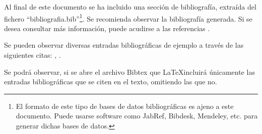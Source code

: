 Al final de este documento se ha incluido una sección de bibliografía, extraída del fichero ``bibliografia.bib''\footnote{El formato de este tipo de bases de datos bibliográficas es ajeno a este documento. Puede usarse software como JabRef, Bibdesk, Mendeley, etc. para generar dichas bases de datos.}. Se recomienda observar la bibliografía generada. Si se desea consultar más información, puede acudirse a las referencias \cite{overleaf-url, latexcompanion}.

Se pueden observar diversas entradas bibliográficas de ejemplo a través de las siguientes citas: \cite{maths-latex}, \cite{lamport}.

Se podrá observar, si se abre el archivo Bibtex que \LaTeX incluirá únicamente las entradas bibliográficas que se citen en el texto, omitiendo las que no.



